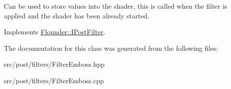 Can be used to store values into the shader, this is called when the filter is applied and the shader has been already started. 



Implements \hyperlink{class_flounder_1_1_i_post_filter_a20420ec0a9bac67437740552bea9ab74}{Flounder\+::\+I\+Post\+Filter}.



The documentation for this class was generated from the following files\+:\begin{DoxyCompactItemize}
\item 
src/post/filters/Filter\+Emboss.\+hpp\item 
src/post/filters/Filter\+Emboss.\+cpp\end{DoxyCompactItemize}
